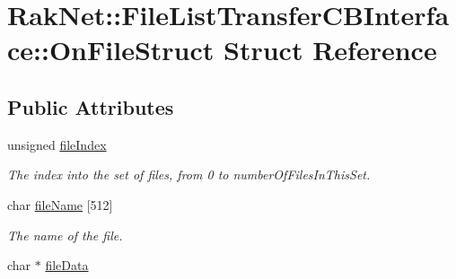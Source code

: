 \hypertarget{struct_rak_net_1_1_file_list_transfer_c_b_interface_1_1_on_file_struct}{\section{Rak\-Net\-:\-:File\-List\-Transfer\-C\-B\-Interface\-:\-:On\-File\-Struct Struct Reference}
\label{struct_rak_net_1_1_file_list_transfer_c_b_interface_1_1_on_file_struct}
}
\subsection*{Public Attributes}
\begin{DoxyCompactItemize}
\item 
\hypertarget{struct_rak_net_1_1_file_list_transfer_c_b_interface_1_1_on_file_struct_a28aaa643d16a0928566be451b9bb7216}{unsigned \hyperlink{struct_rak_net_1_1_file_list_transfer_c_b_interface_1_1_on_file_struct_a28aaa643d16a0928566be451b9bb7216}{file\-Index}}\label{struct_rak_net_1_1_file_list_transfer_c_b_interface_1_1_on_file_struct_a28aaa643d16a0928566be451b9bb7216}

\begin{DoxyCompactList}\small\item\em The index into the set of files, from 0 to number\-Of\-Files\-In\-This\-Set. \end{DoxyCompactList}\item 
\hypertarget{struct_rak_net_1_1_file_list_transfer_c_b_interface_1_1_on_file_struct_a15482268287ed754ea8e01aa8952c673}{char \hyperlink{struct_rak_net_1_1_file_list_transfer_c_b_interface_1_1_on_file_struct_a15482268287ed754ea8e01aa8952c673}{file\-Name} \mbox{[}512\mbox{]}}\label{struct_rak_net_1_1_file_list_transfer_c_b_interface_1_1_on_file_struct_a15482268287ed754ea8e01aa8952c673}

\begin{DoxyCompactList}\small\item\em The name of the file. \end{DoxyCompactList}\item 
\hypertarget{struct_rak_net_1_1_file_list_transfer_c_b_interface_1_1_on_file_struct_a0c1f3b78a003439699946355776fb865}{char $\ast$ \hyperlink{struct_rak_net_1_1_file_list_transfer_c_b_interface_1_1_on_file_struct_a0c1f3b78a003439699946355776fb865}{file\-Data}}\label{struct_rak_net_1_1_file_list_transfer_c_b_interface_1_1_on_file_struct_a0c1f3b78a003439699946355776fb865}


\end{DoxyCompactItemize}
